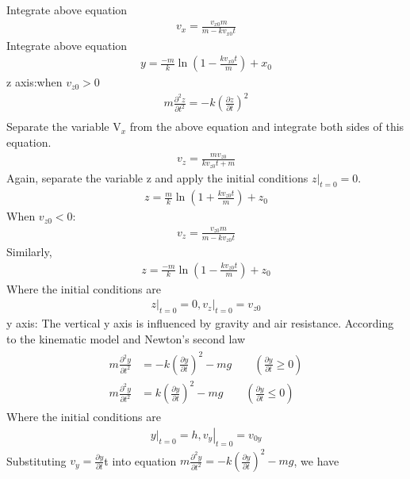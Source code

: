 Integrate above equation
\begin{align}
    v_{x}=\frac{v_{x 0} m}{m-k v_{x 0} t}
\end{align}
Integrate above equation
\begin{align}
y=\frac{-m}{k} \ln \left(1-\frac{k v_{x 0} t}{m}\right)+x_{0}
\end{align}
z axis:when $v_{z 0}>0$
\begin{align}
    m \frac{\partial^{2} z}{\partial t^{2}}=-k\left(\frac{\partial z}{\partial t}\right)^{2}\\
\end{align}
Separate the variable V$_x$ from the above equation and integrate both sides of this equation.
\begin{align}
    v_{z}=\frac{m v_{z 0}}{k v_{z 0} t+m}    
\end{align}
Again, separate the variable z and apply the initial conditions $\left.z\right|_{t=0}=0$.
\begin{align}
     z=\frac{m}{k} \ln \left(1+\frac{k v_{z 0} t}{m}\right)+z_{0}   
\end{align}
When $v_{z 0}<0$:
\begin{align}
    v_{z}=\frac{v_{z 0} m}{m-k v_{z 0} t}
\end{align}
Similarly,
\begin{align}
    z=\frac{-m}{k} \ln \left(1-\frac{k v_{z 0} t}{m}\right)+z_{0}
\end{align}
Where the initial conditions are
\begin{align}
    \left.z\right|_{t=0}=0,\left.v_{z}\right|_{t=0}=v_{z 0}
\end{align}
y axis:
The vertical y axis is influenced by gravity and air resistance. According to the kinematic model and Newton’s second law
\begin{align}
\begin{split}
   m \frac{\partial^{2} y}{\partial t^{2}}&=-k\left(\frac{\partial y}{\partial t}\right)^{2}-m g\qquad(\frac{\partial y}{\partial t} \geq 0)\\
   m \frac{\partial^{2} y}{\partial t^{2}}&=k\left(\frac{\partial y}{\partial t}\right)^{2}-m g\qquad(\frac{\partial y}{\partial t} \leq 0)
\end{split}
\end{align}
Where the initial conditions are
\begin{align}
    \left.y\right|_{t=0}=h,\left.v_{y}\right|_{t=0}=v_{0 y}
\end{align}
Substituting $v_{y}=\frac{\partial y}{\partial t}$t into equation $m \frac{\partial^{2} y}{\partial t^{2}}=-k\left(\frac{\partial y}{\partial t}\right)^{2}-m g$, we have
